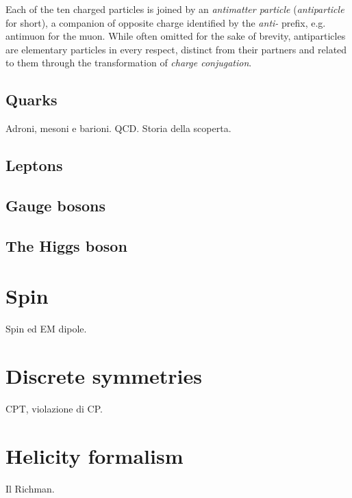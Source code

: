Each of the ten charged particles is joined by an \textit{antimatter particle} (\textit{antiparticle} for short), a companion of opposite charge identified by the \textit{anti-} prefix, e.g. antimuon for the muon. While often omitted for the sake of brevity, antiparticles are elementary particles in every respect, distinct from their partners and related to them through the transformation of \textit{charge conjugation}.

\subsection{Quarks}
Adroni, mesoni e barioni. QCD. Storia della scoperta.

\subsection{Leptons}

\subsection{Gauge bosons}

\subsection{The Higgs boson}

\section{Spin}
Spin ed EM dipole.

\section{Discrete symmetries}
CPT, violazione di CP.

\section{Helicity formalism}
Il Richman.